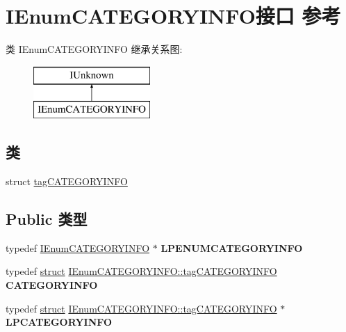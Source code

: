 \hypertarget{interface_i_enum_c_a_t_e_g_o_r_y_i_n_f_o}{}\section{I\+Enum\+C\+A\+T\+E\+G\+O\+R\+Y\+I\+N\+F\+O接口 参考}
\label{interface_i_enum_c_a_t_e_g_o_r_y_i_n_f_o}
类 I\+Enum\+C\+A\+T\+E\+G\+O\+R\+Y\+I\+N\+FO 继承关系图\+:\begin{figure}[H]
\begin{center}
\leavevmode
\includegraphics[height=2.000000cm]{interface_i_enum_c_a_t_e_g_o_r_y_i_n_f_o}
\end{center}
\end{figure}
\subsection*{类}
\begin{DoxyCompactItemize}
\item 
struct \hyperlink{struct_i_enum_c_a_t_e_g_o_r_y_i_n_f_o_1_1tag_c_a_t_e_g_o_r_y_i_n_f_o}{tag\+C\+A\+T\+E\+G\+O\+R\+Y\+I\+N\+FO}
\end{DoxyCompactItemize}
\subsection*{Public 类型}
\begin{DoxyCompactItemize}
\item 
\mbox{\label{interface_i_enum_c_a_t_e_g_o_r_y_i_n_f_o_aa7ef83cef2e023d51474b1abe5bf1448}} 
typedef \hyperlink{interface_i_enum_c_a_t_e_g_o_r_y_i_n_f_o}{I\+Enum\+C\+A\+T\+E\+G\+O\+R\+Y\+I\+N\+FO} $\ast$ {\bfseries L\+P\+E\+N\+U\+M\+C\+A\+T\+E\+G\+O\+R\+Y\+I\+N\+FO}
\item 
\mbox{\label{interface_i_enum_c_a_t_e_g_o_r_y_i_n_f_o_a02ad82cdbb8dd708051b683f5859a4b0}} 
typedef \hyperlink{interfacestruct}{struct} \hyperlink{struct_i_enum_c_a_t_e_g_o_r_y_i_n_f_o_1_1tag_c_a_t_e_g_o_r_y_i_n_f_o}{I\+Enum\+C\+A\+T\+E\+G\+O\+R\+Y\+I\+N\+F\+O\+::tag\+C\+A\+T\+E\+G\+O\+R\+Y\+I\+N\+FO} {\bfseries C\+A\+T\+E\+G\+O\+R\+Y\+I\+N\+FO}
\item 
\mbox{\label{interface_i_enum_c_a_t_e_g_o_r_y_i_n_f_o_a06b658dda60224329c6d2ea151e1c66d}} 
typedef \hyperlink{interfacestruct}{struct} \hyperlink{struct_i_enum_c_a_t_e_g_o_r_y_i_n_f_o_1_1tag_c_a_t_e_g_o_r_y_i_n_f_o}{I\+Enum\+C\+A\+T\+E\+G\+O\+R\+Y\+I\+N\+F\+O\+::tag\+C\+A\+T\+E\+G\+O\+R\+Y\+I\+N\+FO} $\ast$ {\bfseries L\+P\+C\+A\+T\+E\+G\+O\+R\+Y\+I\+N\+FO}
\end{DoxyCompactItemize}
